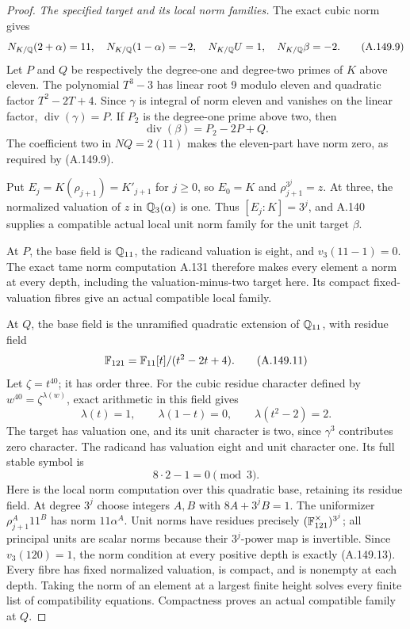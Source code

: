 \begin{proof}
\emph{The specified target and its local norm families.}
The exact cubic norm gives
\[
 N_{K/\mathbb Q}(2+\alpha)=11,
 \quad N_{K/\mathbb Q}(1-\alpha)=-2,
 \quad N_{K/\mathbb Q}U=1,
 \quad N_{K/\mathbb Q}\beta=-2.
\tag{A.149.9}
\]
Let \(P\) and \(Q\) be respectively the degree-one
and degree-two primes of \(K\) above eleven.
The polynomial \(T^3-3\) has linear root 9 modulo
eleven and quadratic factor
\(T^2-2T+4\).
Since \(\gamma\) is integral of norm eleven and
vanishes on the linear factor,
\(\operatorname{div}(\gamma)=P\).
If \(P_2\) is the degree-one prime above two,
then
\[
                  \operatorname{div}(\beta)=P_2-2P+Q.
\tag{A.149.10}
\]
The coefficient two in \(NQ=2(11)\) makes the
eleven-part have norm zero, as required by
(A.149.9).

Put \(E_j=K(\rho_{j+1})=K'_{j+1}\) for \(j\geq0\),
so \(E_0=K\) and \(\rho_{j+1}^{3^j}=z\).
At three, the normalized valuation of \(z\) in
\(\mathbb Q_3(\alpha)\) is one.
Thus \([E_j:K]=3^j\), and A.140 supplies a
compatible actual local unit norm family for
the unit target \(\beta\).

At \(P\), the base field is \(\mathbb Q_{11}\), the
radicand valuation is eight, and
\(v_3(11-1)=0\).
The exact tame norm computation A.131 therefore
makes every element a norm at every depth,
including the valuation-minus-two target here.
Its compact fixed-valuation fibres give an actual
compatible local family.

At \(Q\), the base field is the unramified
quadratic extension of \(\mathbb Q_{11}\), with residue
field
\[
 \mathbb F_{121}=\mathbb F_{11}[t]/(t^2-2t+4).
\tag{A.149.11}
\]
Let \(\zeta=t^{40}\); it has order three.
For the cubic residue character defined by
\(w^{40}=\zeta^{\lambda(w)}\), exact arithmetic
in this field gives
\[
 \lambda(t)=1,\qquad \lambda(1-t)=0,
                       \qquad\lambda(t^2-2)=2.
\tag{A.149.12}
\]
The target has valuation one, and its unit
character is two, since \(\gamma^3\) contributes
zero character.
The radicand has valuation eight and unit
character one.  Its full stable symbol is
\[
                           8\cdot2-1=0\pmod3.
\tag{A.149.13}
\]
Here is the local norm computation over this
quadratic base, retaining its residue field.
At degree \(3^j\) choose integers \(A,B\) with
\(8A+3^jB=1\).
The uniformizer \(\rho_{j+1}^{A}11^B\) has norm
\(11\alpha^A\).
Unit norms have residues precisely
\((\mathbb F_{121}^{\times})^{3^j}\); all principal
units are scalar norms because their
\(3^j\)-power map is invertible.
Since \(v_3(120)=1\), the norm condition at
every positive depth is exactly (A.149.13).
Every fibre has fixed normalized valuation,
is compact, and is nonempty at each depth.
Taking the norm of an element at a largest
finite height solves every finite list of
compatibility equations.  Compactness proves
an actual compatible family at \(Q\).


\end{proof}
